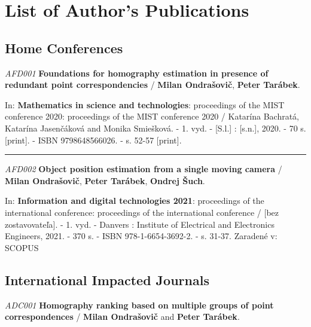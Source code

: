 \section*{List of Author's Publications}

\subsection*{Home Conferences}

\noindent \textit{AFD001} \textbf{Foundations for homography estimation in presence of redundant point correspondencies} / \textbf{Milan Ondrašovič}, \textbf{Peter Tarábek}.

\noindent In: \textbf{Mathematics in science and technologies}: proceedings of the MIST conference 2020: proceedings of the MIST conference 2020 / Katarína Bachratá, Katarína Jasenčáková and Monika Smiešková. - 1. vyd. - [S.l.] : [s.n.], 2020. - 70 s. [print]. - ISBN 9798648566026. - s. 52-57 [print].


\noindent\rule{\textwidth}{0.4pt}

\noindent \textit{AFD002} \textbf{Object position estimation from a single moving camera} /\textbf{ Milan Ondrašovič}, \textbf{Peter Tarábek}, \textbf{Ondrej Šuch}.

\noindent In: \textbf{Information and digital technologies 2021}: proceedings of the international conference: proceedings of the international conference / [bez zostavovateľa]. - 1. vyd. - Danvers : Institute of Electrical and Electronics Engineers, 2021. - 370 s. - ISBN 978-1-6654-3692-2. - s. 31-37.
Zaradené v: SCOPUS


\subsection*{International Impacted Journals}

\noindent \textit{ADC001} \textbf{Homography ranking based on multiple groups of point correspondences} / \textbf{Milan Ondrašovič} and \textbf{Peter Tarábek}.


